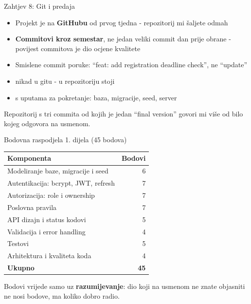 \begin{frame}{Zahtjev 8: Git i predaja}
\begin{itemize}
  \item Projekt je na \textbf{GitHubu} od prvog tjedna - repozitorij mi šaljete odmah
  \item \textbf{Commitovi kroz semestar}, ne jedan veliki commit dan prije obrane - povijest commitova je dio ocjene kvalitete
  \item Smislene commit poruke: \enquote{feat: add registration deadline check}, ne \enquote{update}
  \item {} nikad u gitu - u repozitoriju stoji 
  \item {} s uputama za pokretanje: baza, migracije, seed, server
\end{itemize}

\vspace{0.4em}
Repozitorij s tri commita od kojih je jedan \enquote{final version} govori mi više od bilo kojeg odgovora na usmenom.
\end{frame}

\begin{frame}{Bodovna raspodjela 1. dijela (45 bodova)}
\begin{tabular}{@{}lr@{}}
  \toprule
  \textbf{Komponenta} & \textbf{Bodovi} \\
  \midrule
  Modeliranje baze, migracije i seed & 6 \\
  Autentikacija: bcrypt, JWT, refresh & 7 \\
  Autorizacija: role i ownership & 7 \\
  Poslovna pravila & 7 \\
  API dizajn i status kodovi & 5 \\
  Validacija i error handling & 4 \\
  Testovi & 5 \\
  Arhitektura i kvaliteta koda & 4 \\
  \midrule
  \textbf{Ukupno} & \textbf{45} \\
  \bottomrule
\end{tabular}

\vspace{0.4em}
Bodovi vrijede samo uz \textbf{razumijevanje}: dio koji na usmenom ne znate objasniti ne nosi bodove, ma koliko dobro radio.
\end{frame}

